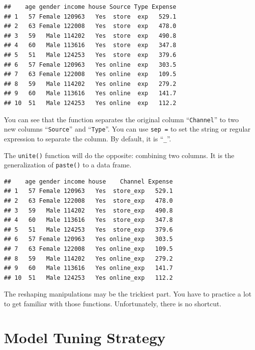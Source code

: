 \documentclass[12pt,]{krantz}
\makeatletter
\newenvironment{Shaded}{\begin{snugshade}}{\end{snugshade}}
\newcommand{\DataTypeTok}[1]{\textcolor[rgb]{0.27,0.27,0.27}{#1}}
\newcommand{\KeywordTok}[1]{\textcolor[rgb]{0.27,0.27,0.27}{\textbf{#1}}}
\newcommand{\NormalTok}[1]{#1}
\newcommand{\OperatorTok}[1]{\textcolor[rgb]{0.43,0.43,0.43}{\textbf{#1}}}
\newcommand{\StringTok}[1]{\textcolor[rgb]{0.5,0.5,0.5}{#1}}
\newenvironment{kframe}{%
\medskip{}
\setlength{\fboxsep}{.8em}
 \def\at@end@of@kframe{}%
 \ifinner\ifhmode%
  \def\at@end@of@kframe{\end{minipage}}%
  \begin{minipage}{\columnwidth}%
 \fi\fi%
 \def\FrameCommand##1{\hskip\@totalleftmargin \hskip-\fboxsep
 \colorbox{shadecolor}{##1}\hskip-\fboxsep
     \hskip-\linewidth \hskip-\@totalleftmargin \hskip\columnwidth}%
 \MakeFramed {\advance\hsize-\width
   \@totalleftmargin\z@ \linewidth\hsize
   \@setminipage}}%
 {\par\unskip\endMakeFramed%
 \at@end@of@kframe}
\renewenvironment{Shaded}{\begin{kframe}}{\end{kframe}}
\makeatother
\begin{document}
\begin{verbatim}
##    age gender income house Source Type Expense
## 1   57 Female 120963   Yes  store  exp   529.1
## 2   63 Female 122008   Yes  store  exp   478.0
## 3   59   Male 114202   Yes  store  exp   490.8
## 4   60   Male 113616   Yes  store  exp   347.8
## 5   51   Male 124253   Yes  store  exp   379.6
## 6   57 Female 120963   Yes online  exp   303.5
## 7   63 Female 122008   Yes online  exp   109.5
## 8   59   Male 114202   Yes online  exp   279.2
## 9   60   Male 113616   Yes online  exp   141.7
## 10  51   Male 124253   Yes online  exp   112.2
\end{verbatim}

You can see that the function separates the original column ``\texttt{Channel}'' to two new columns ``\texttt{Source}'' and ``\texttt{Type}''. You can use \texttt{sep\ =} to set the string or regular expression to separate the column. By default, it is ``\texttt{\_}''.

The \texttt{unite()} function will do the opposite: combining two columns. It is the generalization of \texttt{paste()} to a data frame.

\begin{Shaded}
\end{Shaded}

\begin{verbatim}
##    age gender income house    Channel Expense
## 1   57 Female 120963   Yes  store_exp   529.1
## 2   63 Female 122008   Yes  store_exp   478.0
## 3   59   Male 114202   Yes  store_exp   490.8
## 4   60   Male 113616   Yes  store_exp   347.8
## 5   51   Male 124253   Yes  store_exp   379.6
## 6   57 Female 120963   Yes online_exp   303.5
## 7   63 Female 122008   Yes online_exp   109.5
## 8   59   Male 114202   Yes online_exp   279.2
## 9   60   Male 113616   Yes online_exp   141.7
## 10  51   Male 124253   Yes online_exp   112.2
\end{verbatim}

The reshaping manipulations may be the trickiest part. You have to practice a lot to get familiar with those functions. Unfortunately, there is no shortcut.

\hypertarget{modeltuningstrategy}{%
\chapter{Model Tuning Strategy}\label{modeltuningstrategy}}
\end{document}
